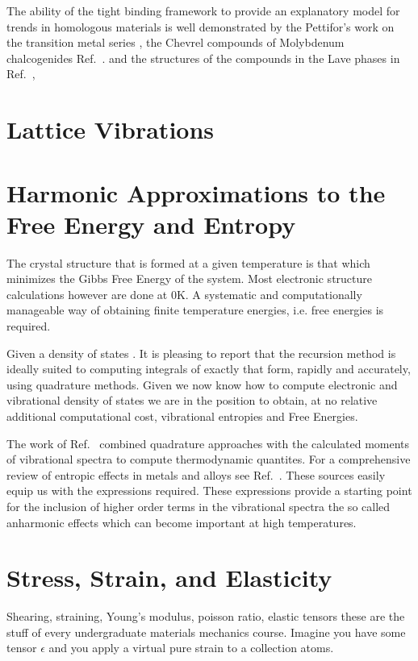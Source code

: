 The ability of the tight binding framework
to provide an explanatory model for trends in homologous materials is
well demonstrated by the Pettifor's work on the transition
metal series \cite{pettifor70}, the Chevrel compounds of Molybdenum 
chalcogenides Ref.~\cite{bullet77}.
and the structures of the compounds in the Lave phases 
in Ref.~\cite{johannes76},

\section{Lattice Vibrations}

\section{Harmonic Approximations to the Free Energy and Entropy}
The crystal structure that is formed at a given temperature is that which
minimizes the Gibbs Free Energy of the system. Most electronic structure calculations
however are done at 0K. A systematic and computationally manageable way of obtaining
finite temperature energies, i.e. free energies is required.

Given a density of states . It is pleasing to report that the recursion method
is ideally suited to computing integrals of exactly that form, rapidly and accurately,
using quadrature methods. Given we now know how to compute electronic and 
vibrational density of states we are in the position to obtain, at no relative additional 
computational cost, vibrational entropies and Free Energies.

The work of Ref.~\cite{wheeler68} combined quadrature approaches
with the calculated moments of vibrational spectra to compute
thermodynamic quantites. For a comprehensive review
of entropic effects in metals and alloys see Ref.~\cite{fultz10}. 
These sources easily equip us with the expressions required. These expressions provide a starting
point for the inclusion of higher order terms in the vibrational spectra
the so called anharmonic effects which can become important at high temperatures.

\section{Stress, Strain, and Elasticity}
Shearing, straining, Young's modulus, poisson ratio, elastic tensors these are the
stuff of every undergraduate materials mechanics course.
Imagine you have some tensor $\epsilon$ and you apply a virtual pure strain to a collection atoms.

